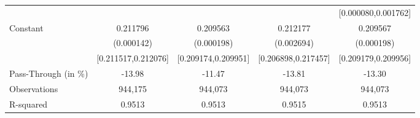 {\begin{tabular}{l*{4}{c}}
                    &                     &                     &                     &[0.000080,0.001762]         \\
Constant            &    0.211796\sym{***}&    0.209563\sym{***}&    0.212177\sym{***}&    0.209567\sym{***}\\
                    &  (0.000142)         &  (0.000198)         &  (0.002694)         &  (0.000198)         \\
                    &[0.211517,0.212076]         &[0.209174,0.209951]         &[0.206898,0.217457]         &[0.209179,0.209956]         \\
\midrule
Pass-Through (in \%)&      -13.98         &      -11.47         &      -13.81         &      -13.30         \\
Observations        &     944,175         &     944,073         &     944,073         &     944,073         \\
R-squared           &      0.9513         &      0.9513         &      0.9515         &      0.9513         \\
\bottomrule
\end{tabular}
}
